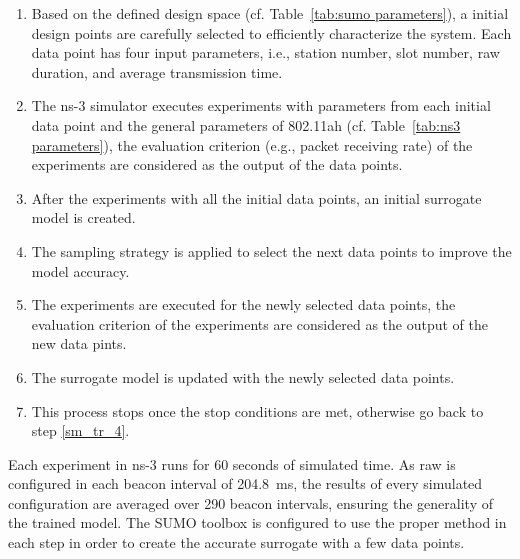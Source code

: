 \begin{enumerate}

\item \label{sm_tr_1} Based on the defined design space (cf. Table~\ref{tab:sumo parameters}), a initial design points are carefully selected to efficiently characterize the system. Each data point has four input parameters, i.e., station number, slot number, \gls{raw} duration, and average transmission time.


\item \label{sm_tr_2} The ns-3 simulator executes experiments with parameters from each initial data point and the general parameters of 802.11ah (cf. Table~\ref{tab:ns3 parameters}), the evaluation criterion (e.g., packet receiving rate) of the experiments are considered as the output of the data points. 

\item \label{sm_tr_3} After the experiments with all the initial data points, an initial surrogate model is created.


\item \label{sm_tr_4} The sampling strategy is applied to select the next data points to improve the model accuracy.

\item \label{sm_tr_5} The experiments are executed for the newly selected data points, the evaluation criterion of the experiments are considered as the output of the new data pints. 

\item \label{sm_tr_6} The surrogate model is updated with the newly selected data points.

\item \label{sm_tr_7}  This process stops once the stop conditions are met, otherwise go back to step \ref{sm_tr_4}.
\end{enumerate}


Each experiment in ns-3 runs for 60 seconds of simulated time. As \gls{raw} is configured in each beacon interval of 204.8~ms, the results of every simulated configuration are averaged over 290 beacon intervals, ensuring the generality of the trained model.
The SUMO toolbox is configured to use the proper method in each step in order to create the accurate surrogate with a few data points. 


